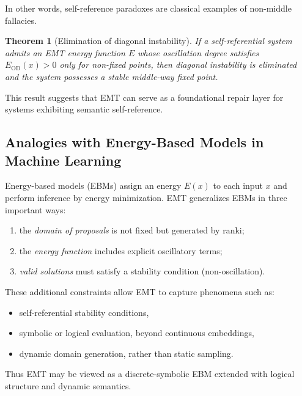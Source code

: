 \documentclass[11pt]{article}
\newtheorem{theorem}{Theorem}[section]
\theoremstyle{definition}
\theoremstyle{remark}
\begin{document}
In other words, self-reference paradoxes are classical examples of
non-middle fallacies.

\begin{theorem}[Elimination of diagonal instability]
If a self-referential system admits an EMT energy function $E$ whose
oscillation degree satisfies $E_{\mathrm{OD}}(x)>0$ only for
non-fixed points, then diagonal instability is eliminated and the
system possesses a stable middle-way fixed point.
\end{theorem}

This result suggests that EMT can serve as a foundational repair layer
for systems exhibiting semantic self-reference.


\subsection{Analogies with Energy-Based Models in Machine Learning}

Energy-based models (EBMs) assign an energy $E(x)$ to each input $x$
and perform inference by energy minimization. EMT generalizes EBMs in
three important ways:

\begin{enumerate}
  \item the \emph{domain of proposals} is not fixed but generated by ranki;
  \item the \emph{energy function} includes explicit oscillatory terms;
  \item \emph{valid solutions} must satisfy a stability condition
        (non-oscillation).
\end{enumerate}

These additional constraints allow EMT to capture phenomena such as:

\begin{itemize}
  \item self-referential stability conditions,
  \item symbolic or logical evaluation, beyond continuous embeddings,
  \item dynamic domain generation, rather than static sampling.
\end{itemize}

Thus EMT may be viewed as a discrete-symbolic EBM extended with
logical structure and dynamic semantics.
\end{document}
